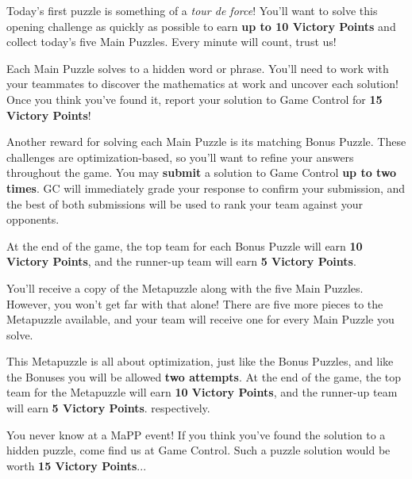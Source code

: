 

Today's first puzzle is something of a
\textit{tour de force}! You'll want to solve this
opening challenge as quickly as possible to earn
\textbf{up to 10 Victory Points} and collect today's five Main Puzzles.
Every minute will count, trust us!


Each Main Puzzle solves to a hidden word or phrase. You'll need to work
with your teammates to discover the mathematics at work and uncover each
solution! Once you think you've found it, report your solution to Game Control
for \textbf{15 Victory Points}!


Another reward for solving each Main Puzzle is its matching Bonus Puzzle.
These challenges are optimization-based, so you'll want to refine your answers
throughout the game. You may \textbf{submit} a solution to Game Control
\textbf{up to two times}.
GC will immediately grade your response to confirm your submission, and
the best of both submissions will be used to rank your team against your
opponents.

At the end of the game, the top team for each Bonus Puzzle
will earn \textbf{10 Victory Points},
and the runner-up team will earn \textbf{5 Victory Points}.


You'll receive a copy of the Metapuzzle along with the five Main Puzzles.
However, you won't get far with that alone! There are five more
pieces to the Metapuzzle available, and your team will receive one for
every Main Puzzle you solve.

This Metapuzzle is all about optimization, just like the Bonus
Puzzles, and like the Bonuses you will be allowed \textbf{two attempts}.
At the end of the game, the top team for the Metapuzzle
will earn \textbf{10 Victory Points},
and the runner-up team will earn \textbf{5 Victory Points}.
respectively.


You never know at a MaPP event! If you think you've found the solution to
a hidden puzzle, come find us at Game Control. Such a puzzle solution would
be worth \textbf{15 Victory Points}...


